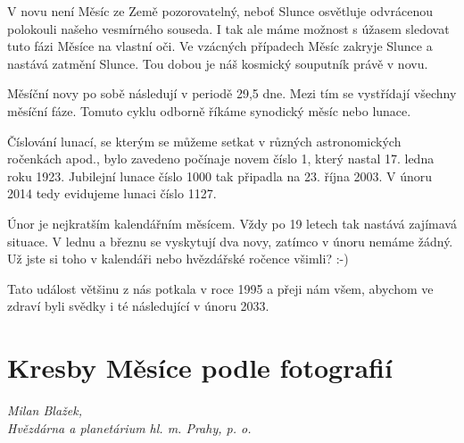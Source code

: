 \documentclass[10pt,a5paper,twoside]{book}
\newcommand{\autor}[1]{
	\begin{flushright}
	\textit{#1}
	\end{flushright}
}
\begin{document}
V novu není Měsíc ze Země pozorovatelný, neboť Slunce osvětluje odvrácenou polokouli našeho vesmírného souseda. I tak ale máme možnost s úžasem sledovat tuto fázi Měsíce na vlastní oči. Ve vzácných případech Měsíc zakryje Slunce a nastává zatmění Slunce. Tou dobou je náš kosmický souputník právě v novu.   

Měsíční novy po sobě následují v periodě 29,5 dne. Mezi tím se vystřídají všechny měsíční fáze. Tomuto cyklu odborně říkáme synodický měsíc nebo lunace.

Číslování lunací, se kterým se můžeme setkat v různých astronomických ročenkách apod., bylo zavedeno počínaje novem číslo 1, který nastal 17. ledna roku 1923. Jubilejní lunace číslo 1000 tak připadla na 23. října 2003. V únoru 2014 tedy evidujeme lunaci číslo 1127.

Únor je nejkratším kalendářním měsícem. Vždy po 19 letech tak nastává zajímavá situace. V lednu a březnu se vyskytují dva novy, zatímco v únoru nemáme žádný. Už jste si toho v kalendáři nebo hvězdářské ročence všimli? :-)

Tato událost většinu z nás potkala v roce 1995 a přeji nám všem, abychom ve zdraví byli svědky i té následující v únoru 2033.

\section*{Kresby Měsíce podle fotografií}
\autor{Milan Blažek,\\Hvězdárna a planetárium hl. m. Prahy, p. o.}
\end{document}
